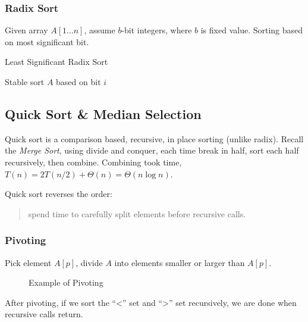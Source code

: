 \subsubsection{Radix Sort}
Given array $A[1 \ldots n]$, assume $b$-bit integers, where $b$ is fixed value.
Sorting based on most significant bit.

\begin{algorithm}[H]
    \caption{Least Significant Radix Sort}\label{algo:lrs}
    \begin{algorithmic}[1]
                \State Stable sort $A$ based on bit $i$
            \EndFor
        \EndProcedure
    \end{algorithmic}
\end{algorithm}

\subsection{Quick Sort \& Median Selection}
Quick sort is a comparison based, recursive, in place sorting (unlike radix).
Recall the \emph{Merge Sort}, using divide and conquer,
each time break in half, sort each half recursively, then combine.
Combining took  time, $T(n) = 2T(n/2) + \Theta(n) = \Theta(n \log n)$.

Quick sort reverses the order:
\begin{quote}
    spend time to carefully split elements before recursive calls.
\end{quote}

\subsubsection{Pivoting}
Pick element $A[p]$, divide $A$ into elements smaller or larger than $A[p]$.

\begin{figure}[H]
    \caption{Example of Pivoting}\label{fig:examplepivot}
\end{figure}

After pivoting, if we sort the ``<'' set and ``>'' set recursively,
we are done when recursive calls return.


